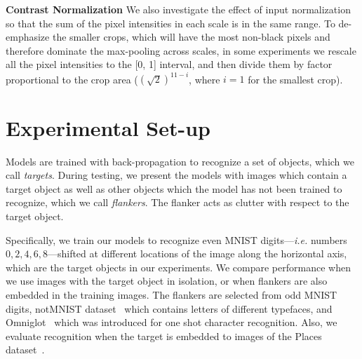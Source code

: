 \documentclass{article}
\begin{document}
\textbf{Contrast Normalization} We also investigate the effect of input normalization so that the sum of the pixel intensities in each scale is in the same range. To de-emphasize the smaller crops, which will have the most non-black pixels and therefore dominate the max-pooling across scales, in some experiments we rescale all the pixel intensities to the [0, 1] interval, and then divide them by factor proportional to the crop area ($(\sqrt{2})^{11 - i}$, where $i=1$ for the smallest crop).
\vspace*{-0.35cm}\section{Experimental Set-up}\vspace*{-0.20cm}\label{sec:setup}
Models are trained with back-propagation to recognize a set of objects, which we call \emph{targets}.  During testing, we present the models with images which contain a target object as well as other objects which the model has not been trained to recognize, which we call \emph{flankers}.  The flanker acts as clutter with respect to the target object.  


Specifically, we train our models to recognize even MNIST digits---\emph{i.e.} numbers $0, 2, 4, 6, 8$---shifted at different locations of the image along the horizontal axis, which are the target objects in our experiments. We compare performance when we use images with the target object in isolation, or when flankers are also embedded in the training images. 
The flankers are selected from odd MNIST digits, notMNIST dataset~\cite{notMNIST} which contains letters of different typefaces, and Omniglot~\cite{lake2015human} which was introduced for one shot character recognition. Also, we evaluate recognition when the target is embedded to images of the Places dataset~\cite{zhou2014learning}. 
\end{document}
